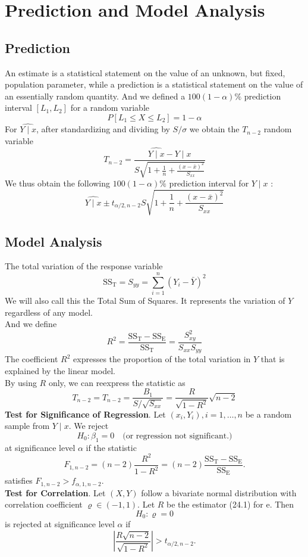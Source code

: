 \documentclass[a4paper,12pt]{article}
\begin{document}
\section{Prediction and Model Analysis}
\subsection{Prediction}
An estimate is a statistical statement on the value of an unknown, but fixed, population parameter, while a prediction is a statistical statement on the value of an essentially random quantity. And we defined a $100(1-\alpha)\%$ prediction interval $[L_1,L_2]$ for a random variable
$$
P[L_1 \leq X \leq L_2] = 1 - \alpha
$$
For $\hat{Y\mid x}$, after standardizing and dividing by $S / \sigma$ we obtain the $T_{n-2}$ random variable
\begin{equation}
T_{n-2}=\frac{\widehat{Y \mid x}-Y \mid x}{S \sqrt{1+\frac{1}{n}+\frac{(x-\bar{x})^2}{S_{x x}}}}
\end{equation}
We thus obtain the following $100(1-\alpha) \%$ prediction interval for $Y \mid x$ :
\begin{equation}
\widehat{Y \mid x} \pm t_{\alpha / 2, n-2} S \sqrt{1+\frac{1}{n}+\frac{(x-\bar{x})^2}{S_{x x}}}
\end{equation}

\subsection{Model Analysis}
The total variation of the response variable
\begin{equation}
    \mathrm{SS_T} = S_{yy} = \sum_{i=1}^n(Y_i-\bar{Y})^2
\end{equation}
We will also call this the Total Sum of Squares. It represents the variation of $Y$ regardless of any model.\\
And we define 
\begin{equation}
    R^2 = \dfrac{\mathrm{SS_T} - \mathrm{SS_E}}{\mathrm{SS_T}} = \dfrac{S_{xy}^2}{S_{xx}S_{yy}}
\end{equation}
The coefficient $R^2$ expresses the proportion of the total variation in $Y$ that is explained by the linear model.\\
By using $R$ only, we can reexpress the statistic as 
\begin{equation}
    T_{n-2} = T_{n-2}=\frac{B_1}{S / \sqrt{S_{x x}}} = \dfrac{R}{\sqrt{1-R^2}}\sqrt{n-2}
\end{equation}
\textbf{Test for Significance of Regression}. Let $\left(x_i, Y_i\right), i=1, \ldots, n$ be a random sample from $Y \mid x$. We reject
$$
H_0: \beta_1=0 \quad \text{(or regression not significant.)}
$$
at significance level $\alpha$ if the statistic
$$
F_{1, n-2}=(n-2) \frac{R^2}{1-R^2}=(n-2) \frac{\mathrm{SS}_{\mathrm{T}}-\mathrm{SS}_{\mathrm{E}}}{\mathrm{SS}_{\mathrm{E}}} .
$$
satisfies $F_{1, n-2}>f_{\alpha, 1, n-2}$.\\
\textbf{Test for Correlation}. Let $(X, Y)$ follow a bivariate normal distribution with correlation coefficient $\varrho \in(-1,1)$. Let $R$ be the estimator (24.1) for e. Then
$$
H_0: \varrho=0
$$
is rejected at significance level $\alpha$ if
$$
\left|\frac{R \sqrt{n-2}}{\sqrt{1-R^2}}\right|>t_{\alpha / 2, n-2} .
$$
\end{document}

